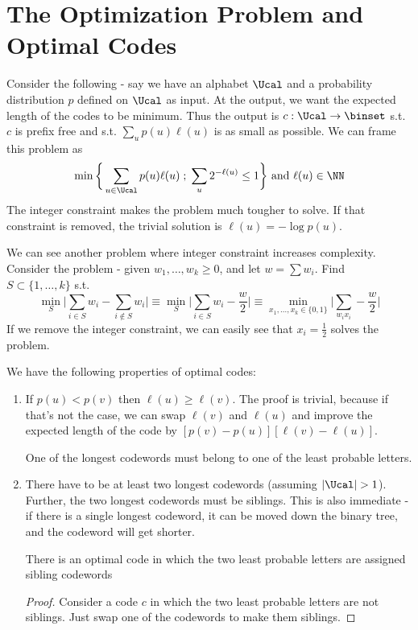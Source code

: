 \section{The Optimization Problem and Optimal Codes}
Consider the following - say we have an alphabet $\Ucal$ and a probability distribution $p$ defined on $\Ucal$ as input. At the output, we want the expected length of the codes to be minimum. Thus the output is $c:\Ucal\to\binset$ s.t. $c$ is prefix free and s.t. $\sum_u p(u) \ell(u)$ is as small as possible. We can frame this problem as
\[
\min \bigg\{ \sum_{u\in \Ucal} p(u) \ell(u) \; ;\; \sum_u 2^{-\ell(u)} \leq 1\bigg\} \text{ and } \ell(u) \in \NN
\]
The integer constraint makes the problem much tougher to solve. If that constraint is removed, the trivial solution is $\ell(u) = -\log p(u)$.
\begin{eg}
We can see another problem where integer constraint increases complexity. Consider the problem - given $w_1, \dots, w_k \geq 0$, and let $w = \sum w_i$. Find $S \subset \{1, \dots, k\}$ s.t. 
\[\min_S \bigg|\sum_{i\in S} w_i - \sum_{i\notin S}w_i\bigg| \equiv \min_S \bigg|\sum_{i\in S}w_i - \frac{w}{2}\bigg| \equiv \min_{x_1, \dots, x_k \in \{0,1\}} \bigg|\sum_{w_i x_i} - \frac{w}{2}\bigg|\]
If we remove the integer constraint, we can easily see that $x_i = \frac{1}{2}$ solves the problem.
\end{eg}
We have the following properties of optimal codes:
\begin{enumerate}
    \item If $p(u) < p(v)$ then $\ell(u) \geq \ell(v)$. The proof is trivial, because if that's not the case, we can swap $\ell(v)$ and $\ell(u)$ and improve the expected length of the code by $[p(v)-p(u)][\ell(v)-\ell(u)]$. 
    \begin{corollary}
    One of the longest codewords must belong to one of the least probable letters.
    \end{corollary}
    \item There have to be at least two longest codewords (assuming $|\Ucal| > 1$). Further, the two longest codewords must be siblings. This is also immediate - if there is a single longest codeword, it can be moved down the binary tree, and the codeword will get shorter.
    \begin{corollary}
    There is an optimal code in which the two least probable letters are assigned sibling codewords
    \end{corollary}
    \begin{proof}
    Consider a code $c$ in which the two least probable letters are not siblings. Just swap one of the codewords to make them siblings.
    \end{proof}
\end{enumerate}
